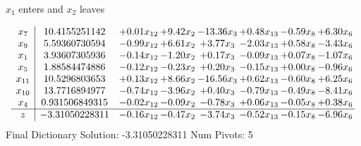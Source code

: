 \documentclass[9pt]{article}
\begin{document}
 $ x_{1} $ enters and $ x_{2} $ leaves 

 \[\begin{array}{c| c c@{\hskip 2pt} c@{\hskip 2pt} c@{\hskip 2pt} c@{\hskip 2pt} c@{\hskip 2pt} c@{\hskip 2pt} }
 x_{7}   &  10.4155251142 & +  0.01 x_{12} & +  9.42 x_{2} & -13.36 x_{3} & +  0.48 x_{13} & -0.59 x_{8} & +  6.30 x_{6}\\
 x_{9}   &  5.59360730594 & -0.99 x_{12} & +  6.61 x_{2} & +  3.77 x_{3} & -2.03 x_{13} & +  0.58 x_{8} & -3.43 x_{6}\\
 x_{1}   &  3.93607305936 & -0.14 x_{12} & -1.20 x_{2} & +  0.17 x_{3} & -0.09 x_{13} & +  0.07 x_{8} & -1.07 x_{6}\\
 x_{5}   &  1.88584474886 & -0.12 x_{12} & -0.23 x_{2} & +  0.20 x_{3} & -0.15 x_{13} & +  0.00 x_{8} & -0.96 x_{6}\\
 x_{11}   &  10.5296803653 & +  0.13 x_{12} & +  8.66 x_{2} & -16.56 x_{3} & +  0.62 x_{13} & -0.60 x_{8} & +  6.25 x_{6}\\
 x_{10}   &  13.7716894977 & -0.74 x_{12} & -3.96 x_{2} & +  0.40 x_{3} & -0.79 x_{13} & -0.49 x_{8} & -8.41 x_{6}\\
 x_{4}   &  0.931506849315 & -0.02 x_{12} & -0.09 x_{2} & -0.78 x_{3} & +  0.06 x_{13} & -0.05 x_{8} & +  0.38 x_{6}\\
\hline
z    &  -3.31050228311 & -0.16 x_{12} & -0.47 x_{2} & -3.74 x_{3} & -0.52 x_{13} & -0.15 x_{8} & -6.96 x_{6}\\
\end{array}\]
Final Dictionary
Solution:  -3.31050228311
Num Pivots:  5
\end{document}
